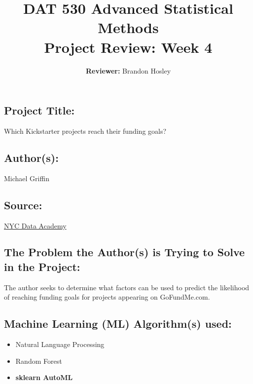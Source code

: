 \documentclass[]{article}
\title{\textbf{DAT 530 Advanced Statistical Methods}\\
	\normalsize{Project Review: Week 4} }
\author{\textbf{Reviewer: }
	Brandon Hosley}
\begin{document}
\setlength{\droptitle}{-10em} 
\pretitle{\begin{flushleft}\LARGE} %
	\posttitle{\end{flushleft}}
\preauthor{\begin{flushleft}\large} %
	\postauthor{\end{flushleft}}
\predate{\begin{flushleft}\large} %
	\postdate{\end{flushleft}}
\maketitle

\vspace{-2em}

\subsection*{Project Title:}
Which Kickstarter projects reach their funding goals?

\subsection*{Author(s):}
Michael Griffin

\subsection*{Source:}
\href{https://nycdatascience.com/blog/student-works/which-kickstarter-projects-reach-their-funding-goals/}{NYC Data Academy}

\subsection*{The Problem the Author(s) is Trying to Solve in the Project:}
The author seeks to determine what factors can be used to predict the likelihood of reaching funding goals for projects appearing on GoFundMe.com.

\subsection*{Machine Learning (ML) Algorithm(s) used:}
\begin{itemize}
	\item Natural Language Processing
	\item Random Forest
	\item \textbf{sklearn AutoML}
\end{itemize}
\end{document}

